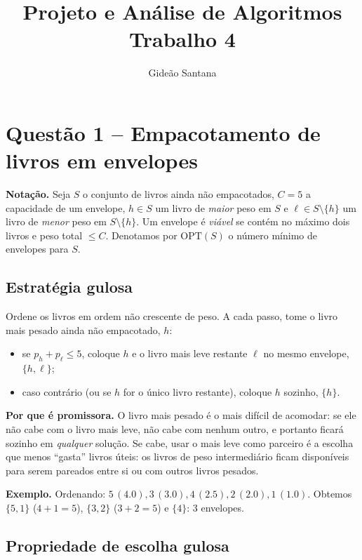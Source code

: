 \documentclass[11pt,a4paper]{article}
\title{Projeto e Análise de Algoritmos \\ Trabalho 4}
\author{Gideão Santana}
\date{}
\begin{document}
\maketitle

\section*{Questão 1 -- Empacotamento de livros em envelopes}
\setcounter{lema}{0}\setcounter{teorema}{0}
\noindent\textbf{Notação.} Seja $S$ o conjunto de livros ainda não empacotados,
$C = 5$ a capacidade de um envelope, $h \in S$ um livro de \emph{maior} peso em $S$
e $\ell \in S\setminus\{h\}$ um livro de \emph{menor} peso em $S\setminus\{h\}$.
Um envelope é \emph{viável} se contém no máximo dois livros e peso total $\le C$.
Denotamos por $\mathrm{OPT}(S)$ o número mínimo de envelopes para $S$.

\subsection{Estratégia gulosa}

Ordene os livros em ordem não crescente de peso. A cada passo, tome o livro
mais pesado ainda não empacotado, $h$:
\begin{itemize}
  \item se $p_h + p_\ell \le 5$, coloque $h$ e o livro mais leve restante $\ell$
        no mesmo envelope, $\{h,\ell\}$;
  \item caso contrário (ou se $h$ for o único livro restante), coloque $h$ sozinho, $\{h\}$.
\end{itemize}

\noindent\textbf{Por que é promissora.} O livro mais pesado é o mais difícil de
acomodar: se ele não cabe com o livro mais leve, não cabe com nenhum outro, e
portanto ficará sozinho em \emph{qualquer} solução. Se cabe, usar o mais leve como
parceiro é a escolha que menos ``gasta'' livros úteis: os livros de peso
intermediário ficam disponíveis para serem pareados entre si ou com outros
livros pesados.

\noindent\textbf{Exemplo.} Ordenando: $5\,(4.0), 3\,(3.0), 4\,(2.5), 2\,(2.0), 1\,(1.0)$.
Obtemos $\{5,1\}$ ($4+1=5$), $\{3,2\}$ ($3+2=5$) e $\{4\}$: 3 envelopes.

\subsection{Propriedade de escolha gulosa}
\end{document}
